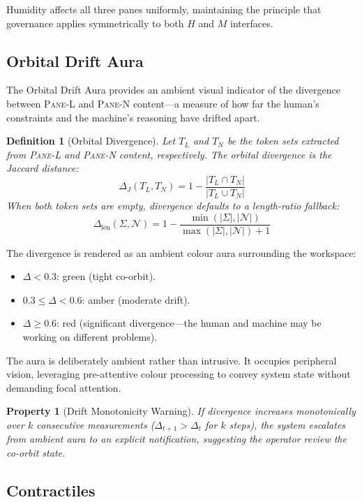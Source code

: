 \documentclass[11pt,a4paper]{article}
\newtheorem{definition}{Definition}[section]
\newtheorem{property}{Property}[section]
\newcommand{\paneL}{\textsc{Pane-L}}
\newcommand{\paneN}{\textsc{Pane-N}}
\begin{document}
Humidity affects all three panes uniformly, maintaining the
principle that governance applies symmetrically to both $H$
and $M$ interfaces.

\subsection{Orbital Drift Aura}

The Orbital Drift Aura provides an ambient visual indicator of the
divergence between \paneL{} and \paneN{} content---a measure of how
far the human's constraints and the machine's reasoning have drifted
apart.

\begin{definition}[Orbital Divergence]\label{def:drift}
Let $T_L$ and $T_N$ be the token sets extracted from \paneL{} and
\paneN{} content, respectively. The orbital divergence is the
Jaccard distance:
\[
  \Delta_J(T_L, T_N) = 1 - \frac{|T_L \cap T_N|}{|T_L \cup T_N|}
\]
When both token sets are empty, divergence defaults to a
length-ratio fallback:
\[
  \Delta_{\text{len}}(\Sigma, \mathcal{N}) =
    1 - \frac{\min(|\Sigma|, |\mathcal{N}|)}{\max(|\Sigma|, |\mathcal{N}|) + 1}
\]
\end{definition}

The divergence is rendered as an ambient colour aura surrounding
the workspace:
\begin{itemize}
  \item $\Delta < 0.3$: green (tight co-orbit).
  \item $0.3 \leq \Delta < 0.6$: amber (moderate drift).
  \item $\Delta \geq 0.6$: red (significant divergence---the
    human and machine may be working on different problems).
\end{itemize}

The aura is deliberately ambient rather than intrusive. It occupies
peripheral vision, leveraging pre-attentive colour processing to
convey system state without demanding focal attention.

\begin{property}[Drift Monotonicity Warning]\label{prop:drift-mono}
If divergence increases monotonically over $k$ consecutive
measurements ($\Delta_{t+1} > \Delta_t$ for $k$ steps), the
system escalates from ambient aura to an explicit notification,
suggesting the operator review the co-orbit state.
\end{property}

\subsection{Contractiles}
\end{document}

